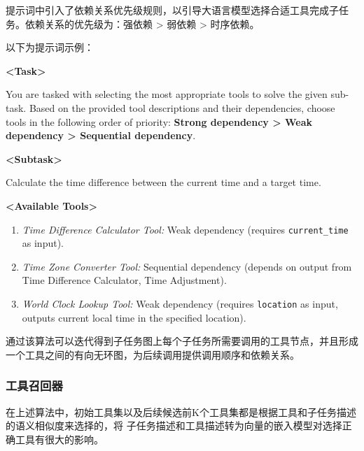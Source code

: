 提示词中引入了依赖关系优先级规则，以引导大语言模型选择合适工具完成子任务。依赖关系的优先级为：强依赖 > 弱依赖 > 时序依赖。

以下为提示词示例：


\begin{center}
\begin{tcolorbox}[colback=bgcolor, colframe=black, width=0.95\textwidth, boxrule=0.5mm, coltitle=white, colbacktitle=titlecolor, title=Example Prompt for Tool Selection]

\textbf{<Task>}

You are tasked with selecting the most appropriate tools to solve the given sub-task. Based on the provided tool descriptions and their dependencies, choose tools in the following order of priority: \textbf{Strong dependency > Weak dependency > Sequential dependency}. 

\textbf{<Subtask>}

Calculate the time difference between the current time and a target time.

\textbf{<Available Tools>}
\begin{enumerate}
    \item \textit{Time Difference Calculator Tool:} Weak dependency (requires \texttt{current\_time} as input).
    \item \textit{Time Zone Converter Tool:} Sequential dependency (depends on output from Time Difference Calculator, Time Adjustment).
    \item \textit{World Clock Lookup Tool:} Weak dependency (requires \texttt{location} as input, outputs current local time in the specified location).
\end{enumerate}

\end{tcolorbox}
\end{center}

通过该算法可以迭代得到子任务图上每个子任务所需要调用的工具节点，并且形成一个工具之间的有向无环图，为后续调用提供调用顺序和依赖关系。

\subsubsection{工具召回器}

在上述算法中，初始工具集以及后续候选前K个工具集都是根据工具和子任务描述的语义相似度来选择的，将
子任务描述和工具描述转为向量的嵌入模型对选择正确工具有很大的影响。

